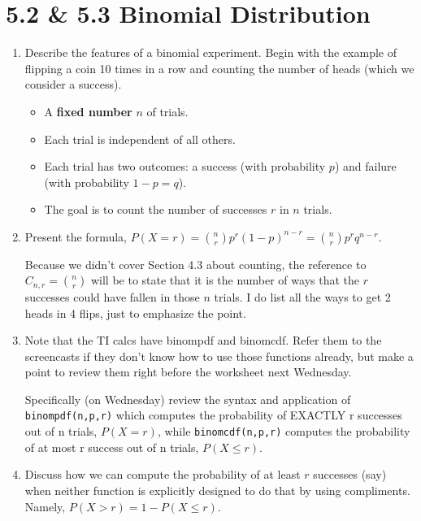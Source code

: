 \documentclass{article}
\begin{document}
\section*{5.2 \& 5.3 Binomial Distribution}

\begin{enumerate}

  \item Describe the features of a binomial experiment. Begin with the example of flipping a coin 10 times in a row and counting the number of heads (which we consider a success).
  
    \begin{itemize}
    
      \item A \textbf{fixed number} $n$ of trials.
      
      \item Each trial is independent of all others.
      
      \item Each trial has two outcomes: a success (with probability $p$) and failure (with probability $1-p=q$).
      
      \item The goal is to count the number of successes $r$ in $n$ trials. 
      
    \end{itemize}
    
  \item Present the formula, $P(X=r) = \binom{n}{r}p^r(1-p)^{n-r} = \binom{n}{r}p^r q^{n-r}.$
  
     Because we didn’t cover Section 4.3 about counting, the reference to $C_{n,r}=\binom{n}{r}$ will be to state that it is the number of ways that the $r$ successes could have fallen in those $n$ trials. I do list all the ways to get 2 heads in 4 flips, just to emphasize the point.
     
  \item Note that the TI calcs have binompdf and binomcdf. Refer them to the screencasts if they don’t know how to use those functions already, but make a point to review them right before the worksheet next Wednesday.
  
   Specifically (on Wednesday) review the syntax and application of \texttt{binompdf(n,p,r)} which computes the probability of EXACTLY r successes out of n trials, $P(X=r)$, while \texttt{binomcdf(n,p,r)} computes the probability of at most r success out of n trials, $P(X\leq r)$. 
   
   \item Discuss how we can compute the probability of at least $r$ successes (say) when neither function is explicitly designed to do that by using compliments. Namely, $P(X>r) = 1-P(X\leq r)$.
   

\end{enumerate}
\end{document}
